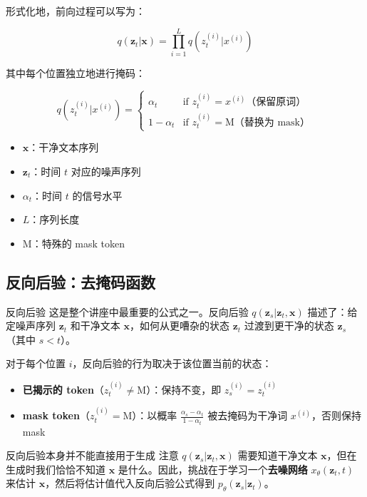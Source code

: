 \documentclass[a4paper]{article}
\begin{document}
形式化地，前向过程可以写为：

$$q(\mathbf{z}_t | \mathbf{x}) = \prod_{i=1}^{L} q(z_t^{(i)} | x^{(i)})$$

其中每个位置独立地进行掩码：

$$q(z_t^{(i)} | x^{(i)}) = \begin{cases} \alpha_t & \text{if } z_t^{(i)} = x^{(i)} \text{（保留原词）} \\ 1 - \alpha_t & \text{if } z_t^{(i)} = \text{M} \text{（替换为 mask）} \end{cases}$$

\begin{itemize}
    \item $\mathbf{x}$：干净文本序列
    \item $\mathbf{z}_t$：时间 $t$ 对应的噪声序列
    \item $\alpha_t$：时间 $t$ 的信号水平
    \item $L$：序列长度
    \item M：特殊的 mask token
\end{itemize}

\subsection{反向后验：去掩码函数}

\begin{importantbox}{反向后验}
这是整个讲座中最重要的公式之一。反向后验 $q(\mathbf{z}_s | \mathbf{z}_t, \mathbf{x})$ 描述了：给定噪声序列 $\mathbf{z}_t$ 和干净文本 $\mathbf{x}$，如何从更嘈杂的状态 $\mathbf{z}_t$ 过渡到更干净的状态 $\mathbf{z}_s$（其中 $s < t$）。
\end{importantbox}

对于每个位置 $i$，反向后验的行为取决于该位置当前的状态：
\begin{itemize}
    \item \textbf{已揭示的 token}（$z_t^{(i)} \neq \text{M}$）：保持不变，即 $z_s^{(i)} = z_t^{(i)}$
    \item \textbf{mask token}（$z_t^{(i)} = \text{M}$）：以概率 $\frac{\alpha_s - \alpha_t}{1 - \alpha_t}$ 被去掩码为干净词 $x^{(i)}$，否则保持 mask
\end{itemize}

\begin{warningbox}{反向后验本身并不能直接用于生成}
注意 $q(\mathbf{z}_s | \mathbf{z}_t, \mathbf{x})$ 需要知道干净文本 $\mathbf{x}$，但在生成时我们恰恰不知道 $\mathbf{x}$ 是什么。因此，挑战在于学习一个\textbf{去噪网络} $x_\theta(\mathbf{z}_t, t)$ 来估计 $\mathbf{x}$，然后将估计值代入反向后验公式得到 $p_\theta(\mathbf{z}_s | \mathbf{z}_t)$。
\end{warningbox}
\end{document}
